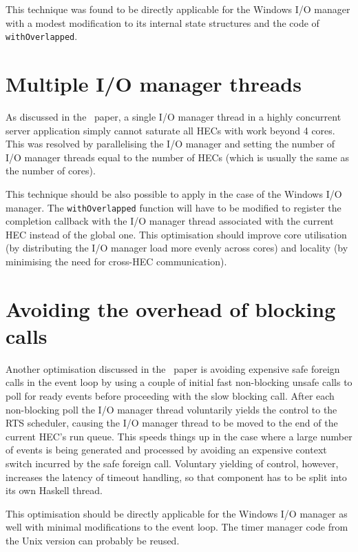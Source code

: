 \documentclass[a4paper,11pt,oneside]{report}
\begin{document}
This technique was found to be directly applicable for the Windows I/O manager
with a modest modification to its internal state structures and the code of
\texttt{withOverlapped}.

\section{Multiple I/O manager threads}
\label{sec:multiple-threads}

As discussed in the~\cite{bib:voellmy} paper, a single I/O manager thread in a
highly concurrent server application simply cannot saturate all HECs with work
beyond 4 cores. This was resolved by parallelising the I/O manager and setting
the number of I/O manager threads equal to the number of HECs (which is usually
the same as the number of cores).

This technique should be also possible to apply in the case of the Windows I/O
manager. The \texttt{withOverlapped} function will have to be modified to
register the completion callback with the I/O manager thread associated with the
current HEC instead of the global one. This optimisation should improve core
utilisation (by distributing the I/O manager load more evenly across cores) and
locality (by minimising the need for cross-HEC communication).

\section{Avoiding the overhead of blocking calls}
\label{sec:avoiding-overhead}

Another optimisation discussed in the~\cite{bib:voellmy} paper is avoiding
expensive safe foreign calls in the event loop by using a couple of initial fast
non-blocking unsafe calls to poll for ready events before proceeding with the
slow blocking call. After each non-blocking poll the I/O manager thread
voluntarily yields the control to the RTS scheduler, causing the I/O manager
thread to be moved to the end of the current HEC's run queue. This speeds things
up in the case where a large number of events is being generated and processed
by avoiding an expensive context switch incurred by the safe foreign
call. Voluntary yielding of control, however, increases the latency of timeout
handling, so that component has to be split into its own Haskell thread.

This optimisation should be directly applicable for the Windows I/O manager as
well with minimal modifications to the event loop. The timer manager code from
the Unix version can probably be reused.
\end{document}
